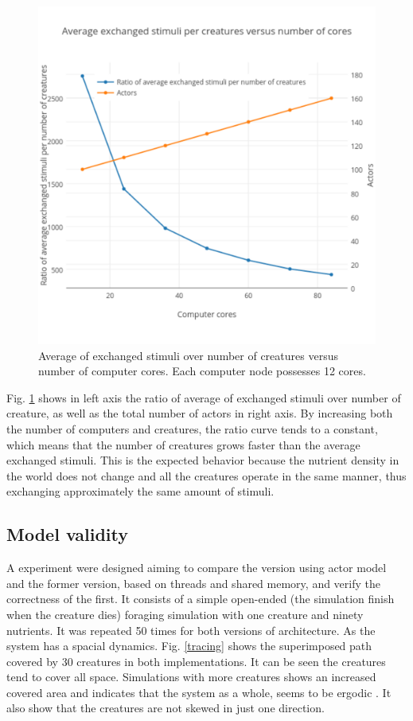 \documentclass[runningheads]{llncs}
\begin{document}
\begin{figure}
	\centering
	\includegraphics[scale=0.35]{images/ratioCreature}
	\caption{Average of exchanged stimuli over number of creatures versus number of computer cores. Each computer node possesses 12 cores.}
	\label{inferno}
\end{figure}

Fig. \ref{inferno} shows in left axis the ratio of average of exchanged stimuli over number of creature, as well as the total number of actors in right axis. By increasing both the number of computers and creatures, the ratio curve tends to a constant, which means that the number of creatures grows faster than the average exchanged stimuli. This is the expected behavior because the nutrient density in the world does not change and all the creatures operate in the same manner, thus exchanging approximately the same amount of stimuli.


\subsection{Model validity}
A experiment were designed aiming to compare the version using actor model and the former version, based on threads and shared memory, and verify the correctness of the first. It consists of a simple open-ended (the simulation finish when the creature dies) foraging simulation with one creature and ninety nutrients. It was repeated 50 times for both versions of architecture. As the system has a spacial dynamics. Fig. \ref{tracing} shows the superimposed path covered by 30 creatures in both implementations. It can be seen the creatures tend to cover all space. Simulations with more creatures shows an increased covered area and indicates that the system as a whole, seems to be ergodic \cite{Cornfeld2012}. It also show that the creatures are not skewed in just one direction.
\end{document}
